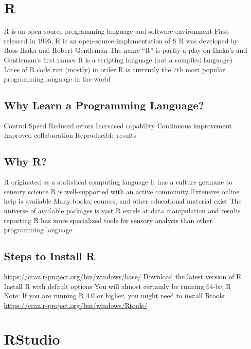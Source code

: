 \documentclass[
]{book}
\begin{document}
\hypertarget{r}{%
\section{R}\label{r}}

R is an open-source programming language and software environment
First released in 1995, R is an open-source implementation of S
R was developed by Ross Ihaka and Robert Gentleman
The name ``R'' is partly a play on Ihaka's and Gentleman's first names
R is a scripting language (not a compiled language)
Lines of R code run (mostly) in order
R is currently the 7th most popular programming language in the world

\hypertarget{why-learn-a-programming-language}{%
\subsection{Why Learn a Programming Language?}\label{why-learn-a-programming-language}}

Control
Speed
Reduced errors
Increased capability
Continuous improvement
Improved collaboration
Reproducible results

\hypertarget{why-r-1}{%
\subsection{Why R?}\label{why-r-1}}

R originated as a statistical computing language
It has a culture germane to sensory science
R is well-supported with an active community
Extensive online help is available
Many books, courses, and other educational material exist
The universe of available packages is vast
R excels at data manipulation and results reporting
R has more specialized tools for sensory analysis than other programming language

\hypertarget{steps-to-install-r}{%
\subsection{Steps to Install R}\label{steps-to-install-r}}

\url{https://cran.r-project.org/bin/windows/base/}
Download the latest version of R
Install R with default options
You will almost certainly be running 64-bit R
Note: If you are running R 4.0 or higher, you might need to install Rtools:
\url{https://cran.r-project.org/bin/windows/Rtools/}

\hypertarget{rstudio}{%
\section{RStudio}\label{rstudio}}
\end{document}
